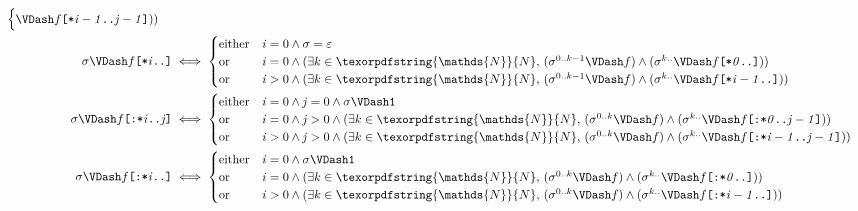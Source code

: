 \documentclass[a4paper,twoside,10pt,DIV=12]{scrreprt}
\newcommand{\N}{\texorpdfstring{\ensuremath{\mathds{N}}}{N}}
\newcommand{\0}{\texttt{0}}
\newcommand{\1}{\texttt{1}}
\newcommand{\STAR}[1]{\texttt{[*#1]}}
\newcommand{\FSTAR}[1]{\texttt{[:*#1]}}
\newcommand\mvar[1]{\ensuremath{\mathit{#1}}}
\begin{document}
{\begin{align*}
\begin{cases}
      \VDash f\STAR{\mvar{i-1}..\mvar{j-1}}))\\
  \end{cases}\\
  \sigma\VDash f\STAR{\mvar{i}..} & \iff
  \begin{cases}
    \text{either} & \mvar{i}=0 \land \sigma=\varepsilon \\
    \text{or} & \mvar{i}=0 \land (\exists k\in\N,\,
      (\sigma^{0..k-1}\VDash f) \land (\sigma^{k..}
      \VDash f\STAR{\mvar{0}..}))\\
    \text{or} & \mvar{i}>0 \land (\exists k\in\N,\,
      (\sigma^{0..k-1}\VDash f) \land (\sigma^{k..}
      \VDash f\STAR{\mvar{i-1}..}))\\
  \end{cases}\\
  \sigma\VDash f\FSTAR{\mvar{i}..\mvar{j}}& \iff
  \begin{cases}
    \text{either} & \mvar{i}=0 \land \mvar{j}=0 \land \sigma\VDash\1 \\
    \text{or} & \mvar{i}=0 \land \mvar{j}>0 \land (\exists k\in\N,\,
      (\sigma^{0..k}\VDash f) \land (\sigma^{k..}
      \VDash f\FSTAR{\mvar{0}..\mvar{j-1}}))\\
    \text{or} & \mvar{i}>0 \land \mvar{j}>0 \land (\exists k\in\N,\,
      (\sigma^{0..k}\VDash f) \land (\sigma^{k..}
      \VDash f\FSTAR{\mvar{i-1}..\mvar{j-1}}))\\
  \end{cases}\\
  \sigma\VDash f\FSTAR{\mvar{i}..} & \iff
  \begin{cases}
    \text{either} & \mvar{i}=0 \land \sigma\VDash\1 \\
    \text{or} & \mvar{i}=0 \land (\exists k\in\N,\,
      (\sigma^{0..k}\VDash f) \land (\sigma^{k..}
      \VDash f\FSTAR{\mvar{0}..}))\\
    \text{or} & \mvar{i}>0 \land (\exists k\in\N,\,
      (\sigma^{0..k}\VDash f) \land (\sigma^{k..}
      \VDash f\FSTAR{\mvar{i-1}..}))\\
  \end{cases}
\end{align*}}
\end{document}
